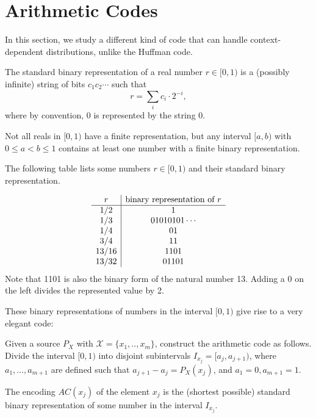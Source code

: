 \section{Arithmetic Codes}
In this section, we study a different kind of code that can handle context-dependent distributions, unlike the Huffman code.

\begin{definition}
The standard binary representation of a real number $r \in [0,1)$ is a (possibly infinite) string of bits $c_1c_2\cdots$ such that
\[
r = \sum_i c_i \cdot 2^{-i},
\]
where by convention, 0 is represented by the string 0.
\end{definition}
Not all reals in $[0,1)$ have a finite representation, but any interval $[a,b)$ with $0 \leq a < b \leq 1$ contains at least one number with a finite binary representation.
\begin{example}
The following table lists some numbers $r \in [0,1)$ and their standard binary representation.

\[
\begin{array}{c | c}
r & \mbox{binary representation of } r\\\hline
1/2 & 1\\
1/3 & 01010101\cdots\\
1/4 & 01\\
3/4 & 11\\
13/16 & 1101\\
13/32 & 01101\\
\end{array}
\]
Note that 1101 is also the binary form of the natural number 13. Adding a 0 on the left divides the represented value by 2.
\end{example}
These binary representations of numbers in the interval $[0,1)$ give rise to a very elegant code: 
\begin{definition}\label{def:arithmetic}
Given a source $P_X$ with $\mathcal{X} = \{x_1, .., x_m\}$, construct the arithmetic code as follows. Divide the interval $[0,1)$ into disjoint subintervals $I_{x_j} = [a_j, a_{j+1})$, where $a_1, \ldots, a_{m+1}$ are defined such that $a_{j+1} - a_j = P_X(x_j)$, and $a_1 = 0, a_{m+1} = 1$.

The encoding $AC(x_j)$ of the element $x_j$ is the (shortest possible) standard binary representation of some number in the interval $I_{x_j}$. 
\end{definition}

